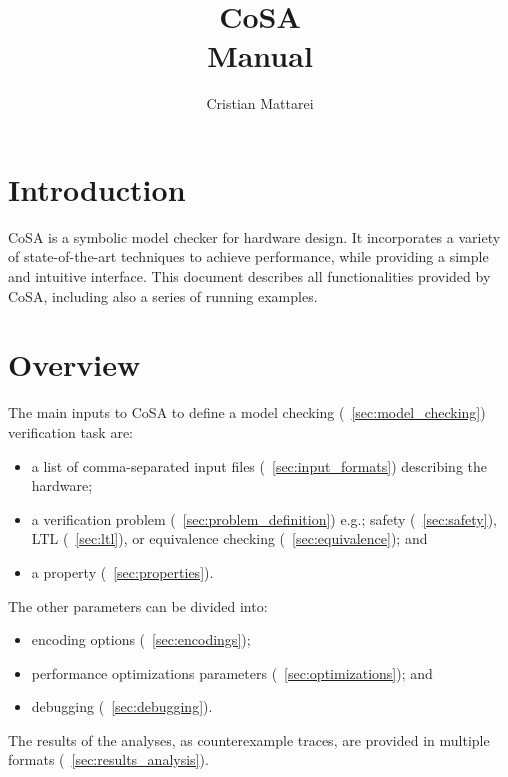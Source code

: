 \documentclass{article}
\theoremstyle{definition}
\begin{document}
\title{\textbf{CoSA}\\Manual}
\author{Cristian Mattarei}

\maketitle

\newpage
\tableofcontents

\newpage
\section*{Introduction}

CoSA is a symbolic model checker for hardware design. It incorporates
a variety of state-of-the-art techniques to achieve performance, while
providing a simple and intuitive interface. This document describes
all functionalities provided by CoSA, including also a series of
running examples. 


\section{Overview}

The main inputs to CoSA to define a model checking
(\textsection~\ref{sec:model_checking}) verification task are:
\begin{itemize}
\item a list of comma-separated input files
  (\textsection~\ref{sec:input_formats}) describing the hardware;
\item a verification problem
  (\textsection~\ref{sec:problem_definition}) e.g.; safety
  (\textsection~\ref{sec:safety}), LTL (\textsection~\ref{sec:ltl}),
  or equivalence checking (\textsection~\ref{sec:equivalence}); and
\item a property (\textsection~\ref{sec:properties}).
\end{itemize}

\noindent
The other parameters can be divided into:
\begin{itemize}
\item encoding options (\textsection~\ref{sec:encodings});
\item performance optimizations parameters
  (\textsection~\ref{sec:optimizations}); and
\item debugging (\textsection~\ref{sec:debugging}).
\end{itemize}

\noindent
The results of the analyses, as counterexample traces, are provided in
multiple formats (\textsection~\ref{sec:results_analysis}).
\end{document}
